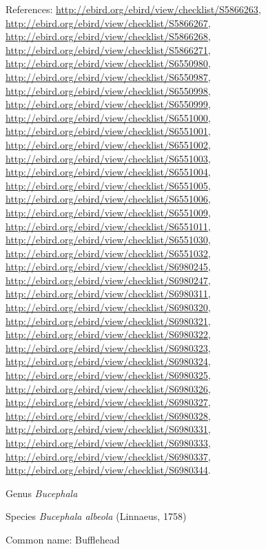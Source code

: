 \documentclass[9pt, article]{memoir}
\begin{document}
\begin{multicols}{2}
References: 
\url{http://ebird.org/ebird/view/checklist/S5866263}, 
\url{http://ebird.org/ebird/view/checklist/S5866267}, 
\url{http://ebird.org/ebird/view/checklist/S5866268}, 
\url{http://ebird.org/ebird/view/checklist/S5866271}, 
\url{http://ebird.org/ebird/view/checklist/S6550980}, 
\url{http://ebird.org/ebird/view/checklist/S6550987}, 
\url{http://ebird.org/ebird/view/checklist/S6550998}, 
\url{http://ebird.org/ebird/view/checklist/S6550999}, 
\url{http://ebird.org/ebird/view/checklist/S6551000}, 
\url{http://ebird.org/ebird/view/checklist/S6551001}, 
\url{http://ebird.org/ebird/view/checklist/S6551002}, 
\url{http://ebird.org/ebird/view/checklist/S6551003}, 
\url{http://ebird.org/ebird/view/checklist/S6551004}, 
\url{http://ebird.org/ebird/view/checklist/S6551005}, 
\url{http://ebird.org/ebird/view/checklist/S6551006}, 
\url{http://ebird.org/ebird/view/checklist/S6551009}, 
\url{http://ebird.org/ebird/view/checklist/S6551011}, 
\url{http://ebird.org/ebird/view/checklist/S6551030}, 
\url{http://ebird.org/ebird/view/checklist/S6551032}, 
\url{http://ebird.org/ebird/view/checklist/S6980245}, 
\url{http://ebird.org/ebird/view/checklist/S6980247}, 
\url{http://ebird.org/ebird/view/checklist/S6980311}, 
\url{http://ebird.org/ebird/view/checklist/S6980320}, 
\url{http://ebird.org/ebird/view/checklist/S6980321}, 
\url{http://ebird.org/ebird/view/checklist/S6980322}, 
\url{http://ebird.org/ebird/view/checklist/S6980323}, 
\url{http://ebird.org/ebird/view/checklist/S6980324}, 
\url{http://ebird.org/ebird/view/checklist/S6980325}, 
\url{http://ebird.org/ebird/view/checklist/S6980326}, 
\url{http://ebird.org/ebird/view/checklist/S6980327}, 
\url{http://ebird.org/ebird/view/checklist/S6980328}, 
\url{http://ebird.org/ebird/view/checklist/S6980331}, 
\url{http://ebird.org/ebird/view/checklist/S6980333}, 
\url{http://ebird.org/ebird/view/checklist/S6980337}, 
\url{http://ebird.org/ebird/view/checklist/S6980344}.

\vspace{6pt}\noindent\hspace{30pt}Genus \textit{Bucephala}


\vspace{6pt}\noindent\hspace{36pt}Species \textit{Bucephala albeola} (Linnaeus, 1758)


Common name: Bufflehead


\end{multicols}
\end{document}
